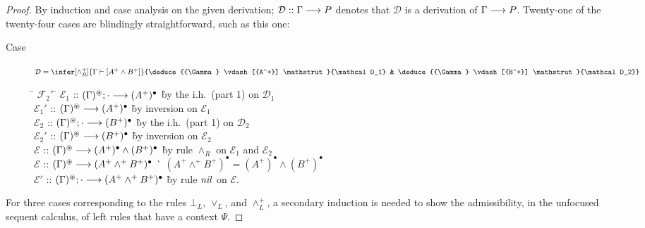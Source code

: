 \documentclass[acmtocl]{robtrans}\pdfoutput=1
\newcommand{\seq}[2]{{#1} \longrightarrow {#2} \mathstrut}
\newcommand{\rfoc}[2]{{#1} \vdash [{#2}] \mathstrut}
\begin{document}
\begin{proof}
By induction and case analysis on the given derivation;
$\mathcal D :: \seq{\Gamma}{P}$ denotes that $\mathcal D$ is a
derivation of $\seq{\Gamma}{P}$. Twenty-one of the twenty-four cases
are blindingly straightforward, such as this one:

\begin{description}
\item[Case]
$\mathcal D = \infer[\wedge^+_R]
{\rfoc{\Gamma}{A^+ \wedge B^+}}
{\deduce{\rfoc{\Gamma}{A^+}}{\mathcal D_1} 
 & 
 \deduce{\rfoc{\Gamma}{B^+}}{\mathcal D_2}}$

\begin{tabbing}
\qquad \= $\mathcal F_2'$ \= \kill
\>
$\mathcal E_1$ \> :: $\seq{(\Gamma)^\circledast; \cdot}{(A^+)^\bullet}$
 \` by the i.h.~(part 1) on $\mathcal D_1$
\\
\>
$\mathcal E_1'$ \> :: $\seq{(\Gamma)^\circledast}{(A^+)^\bullet}$
 \` by inversion on $\mathcal E_1$
\\
\>
$\mathcal E_2$ \> :: $\seq{(\Gamma)^\circledast; \cdot}{(B^+)^\bullet}$
 \` by the i.h.~(part 1) on $\mathcal D_2$
\\
\>
$\mathcal E_2'$ \> :: $\seq{(\Gamma)^\circledast}{(B^+)^\bullet}$
 \` by inversion on $\mathcal E_2$
\\
\>
$\mathcal E$ \> :: $\seq{(\Gamma)^\circledast}{(A^+)^\bullet \wedge (B^+)^\bullet}$
 \` by rule $\wedge_R$ on $\mathcal E_1$ and $\mathcal E_2$
\\
\>
$\mathcal E$ \> :: $\seq{(\Gamma)^\circledast}{(A^+ \wedge^+ B^+)^\bullet}$
 \` $(A^+  \wedge^+ B^+)^\bullet = (A^+)^\bullet \wedge (B^+)^\bullet$
\\
\>
$\mathcal E'$ \> :: $\seq{(\Gamma)^\circledast; \cdot}{(A^+ \wedge^+ B^+)^\bullet}$
 \` by rule ${\it nil}$ on $\mathcal E$.
\end{tabbing}
\end{description}

\noindent
For three cases corresponding to the rules $\bot_L$, $\vee_L$, and
$\wedge^+_L$, a secondary induction is needed to show the
admissibility, in the unfocused sequent calculus, of left rules that
have a context $\Psi$.


\end{proof}
\end{document}

